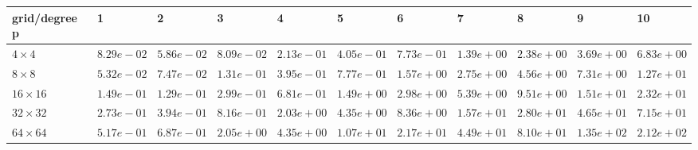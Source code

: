 \begin{tabular}{lllllllllll}
\hline
 grid/degree p   & 1          & 2          & 3          & 4          & 5          & 6          & 7          & 8          & 9          & 10         \\
\hline
 $4 \times 4$    & $8.29e-02$ & $5.86e-02$ & $8.09e-02$ & $2.13e-01$ & $4.05e-01$ & $7.73e-01$ & $1.39e+00$ & $2.38e+00$ & $3.69e+00$ & $6.83e+00$ \\
 $8 \times 8$    & $5.32e-02$ & $7.47e-02$ & $1.31e-01$ & $3.95e-01$ & $7.77e-01$ & $1.57e+00$ & $2.75e+00$ & $4.56e+00$ & $7.31e+00$ & $1.27e+01$ \\
 $16 \times 16$  & $1.49e-01$ & $1.29e-01$ & $2.99e-01$ & $6.81e-01$ & $1.49e+00$ & $2.98e+00$ & $5.39e+00$ & $9.51e+00$ & $1.51e+01$ & $2.32e+01$ \\
 $32 \times 32$  & $2.73e-01$ & $3.94e-01$ & $8.16e-01$ & $2.03e+00$ & $4.35e+00$ & $8.36e+00$ & $1.57e+01$ & $2.80e+01$ & $4.65e+01$ & $7.15e+01$ \\
 $64 \times 64$  & $5.17e-01$ & $6.87e-01$ & $2.05e+00$ & $4.35e+00$ & $1.07e+01$ & $2.17e+01$ & $4.49e+01$ & $8.10e+01$ & $1.35e+02$ & $2.12e+02$ \\
\hline
\end{tabular}